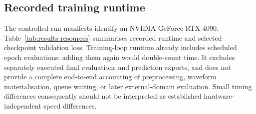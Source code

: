\documentclass[12pt,a4paper]{report}
\begin{document}
\subsection{Recorded training runtime}

The controlled run manifests identify an NVIDIA GeForce RTX 4090. Table~\ref{tab:results-resources} summarises recorded runtime and selected-checkpoint validation loss. Training-loop runtime already includes scheduled epoch evaluations; adding them again would double-count time. It excludes separately executed final evaluations and prediction exports, and does not provide a complete end-to-end accounting of preprocessing, waveform materialisation, queue waiting, or later external-domain evaluation. Small timing differences consequently should not be interpreted as established hardware-independent speed differences.
\end{document}
